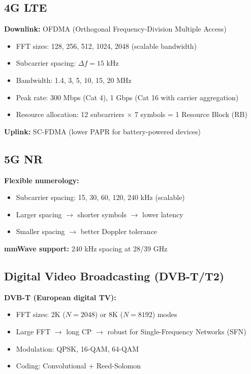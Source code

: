 \subsection{4G LTE}

\textbf{Downlink:} OFDMA (Orthogonal Frequency-Division Multiple Access)
\begin{itemize}
\item FFT sizes: 128, 256, 512, 1024, 2048 (scalable bandwidth)
\item Subcarrier spacing: $\Delta f = 15$ kHz
\item Bandwidth: 1.4, 3, 5, 10, 15, 20 MHz
\item Peak rate: 300 Mbps (Cat 4), 1 Gbps (Cat 16 with carrier aggregation)
\item Resource allocation: 12 subcarriers $\times$ 7 symbols = 1 Resource Block (RB)
\end{itemize}

\textbf{Uplink:} SC-FDMA (lower PAPR for battery-powered devices)

\subsection{5G NR}

\textbf{Flexible numerology:}
\begin{itemize}
\item Subcarrier spacing: 15, 30, 60, 120, 240 kHz (scalable)
\item Larger spacing $\rightarrow$ shorter symbols $\rightarrow$ lower latency
\item Smaller spacing $\rightarrow$ better Doppler tolerance
\end{itemize}

\textbf{mmWave support:} 240 kHz spacing at 28/39 GHz

\subsection{Digital Video Broadcasting (DVB-T/T2)}

\textbf{DVB-T (European digital TV):}
\begin{itemize}
\item FFT sizes: 2K ($N = 2048$) or 8K ($N = 8192$) modes
\item Large FFT $\rightarrow$ long CP $\rightarrow$ robust for Single-Frequency Networks (SFN)
\item Modulation: QPSK, 16-QAM, 64-QAM
\item Coding: Convolutional + Reed-Solomon
\end{itemize}

